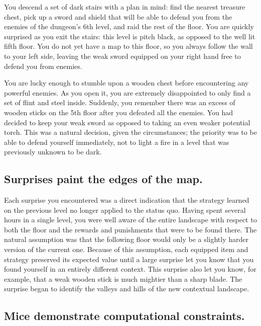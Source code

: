 \documentclass[]{article}
\begin{document}
You descend a set of dark stairs with a plan in mind: find the nearest treasure chest, pick up a sword and shield that will be able to defend you from the enemies of the dungeon's 6th level, and raid the rest of the floor.  You are quickly surprised as you exit the stairs: this level is pitch black, as opposed to the well lit fifth floor.  You do not yet have a map to this floor, so you always follow the wall to your left side, leaving the weak sword equipped on your right hand free to defend you from enemies.

You are lucky enough to stumble upon a wooden chest before encountering any powerful enemies.  As you open it, you are extremely disappointed to only find a set of flint and steel inside.  Suddenly, you remember there was an excess of wooden sticks on the 5th floor after you defeated all the enemies.  You had decided to keep your weak sword as opposed to taking an even weaker potential torch.  This was a natural decision, given the circumstances; the priority was to be able to defend yourself immediately, not to light a fire in a level that was previously unknown to be dark.

\subsection{Surprises paint the edges of the map.}

Each surprise you encountered was a direct indication that the strategy learned on the previous level no longer applied to the status quo.  Having spent several hours in a single level, you were well aware of the entire landscape with respect to both the floor and the rewards and punishments that were to be found there.  The natural assumption was that the following floor would only be a slightly harder version of the current one.  Because of this assumption, each equipped item and strategy preserved its expected value until a large surprise let you know that you found yourself in an entirely different context.  This surprise also let you know, for example, that a weak wooden stick is much mightier than a sharp blade.  The surprise began to identify the valleys and hills of the new contextual landscape.

\subsection{Mice demonstrate computational constraints.}
\end{document}
